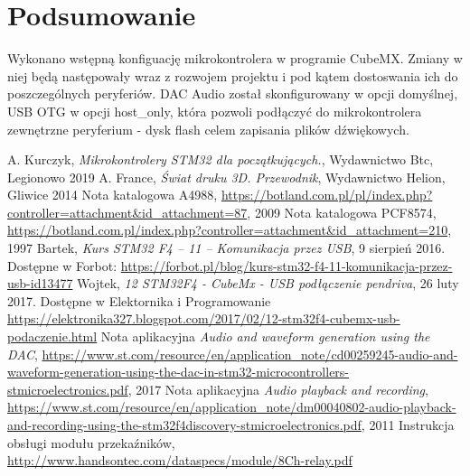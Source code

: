 \documentclass[10pt, a4paper]{article}
\begin{document}


\section{Podsumowanie}

Wykonano wstępną konfiguację mikrokontrolera w programie CubeMX. Zmiany w niej będą następowały wraz z rozwojem projektu i pod kątem dostoswania ich do poszczególnych peryferiów.
DAC Audio został skonfigurowany w opcji domyślnej, USB OTG w opcji host{\_}only, która pozwoli podłączyć do mikrokontrolera zewnętrzne peryferium - dysk flash celem zapisania plików dźwiękowych.


\newpage
%
%
\begin{thebibliography}{9}

    A. Kurczyk, \emph{Mikrokontrolery STM32 dla początkujących.}, Wydawnictwo Btc, Legionowo 2019
    A. France, \emph{Świat druku 3D. Przewodnik}, Wydawnictwo Helion, Gliwice 2014
    Nota katalogowa A4988, \url{https://botland.com.pl/pl/index.php?controller=attachment&id_attachment=87}, 2009
    Nota katalogowa PCF8574, \url{https://botland.com.pl/index.php?controller=attachment&id_attachment=210}, 1997
    Bartek, \emph{Kurs STM32 F4 – 11 – Komunikacja przez USB}, 9 sierpień 2016. Dostępne w Forbot: \url{https://forbot.pl/blog/kurs-stm32-f4-11-komunikacja-przez-usb-id13477}
    Wojtek, \emph{12 STM32F4 - CubeMx - USB podłączenie pendriva}, 26 luty 2017. Dostępne w Elektornika i Programowanie \url{https://elektronika327.blogspot.com/2017/02/12-stm32f4-cubemx-usb-podaczenie.html}
    Nota aplikacyjna \emph{Audio and waveform generation using the DAC}, \url{https://www.st.com/resource/en/application_note/cd00259245-audio-and-waveform-generation-using-the-dac-in-stm32-microcontrollers-stmicroelectronics.pdf}, 2017
    Nota aplikacyjna \emph{Audio playback and recording},
    \url{https://www.st.com/resource/en/application_note/dm00040802-audio-playback-and-recording-using-the-stm32f4discovery-stmicroelectronics.pdf}, 2011
    Instrukcja obsługi modułu przekaźników, \url{http://www.handsontec.com/dataspecs/module/8Ch-relay.pdf}
\end{thebibliography}
\end{document}
